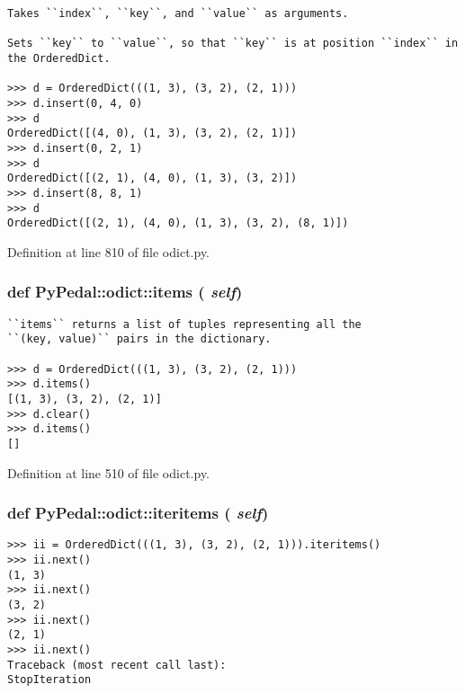 \footnotesize\begin{verbatim}
Takes ``index``, ``key``, and ``value`` as arguments.

Sets ``key`` to ``value``, so that ``key`` is at position ``index`` in
the OrderedDict.

>>> d = OrderedDict(((1, 3), (3, 2), (2, 1)))
>>> d.insert(0, 4, 0)
>>> d
OrderedDict([(4, 0), (1, 3), (3, 2), (2, 1)])
>>> d.insert(0, 2, 1)
>>> d
OrderedDict([(2, 1), (4, 0), (1, 3), (3, 2)])
>>> d.insert(8, 8, 1)
>>> d
OrderedDict([(2, 1), (4, 0), (1, 3), (3, 2), (8, 1)])
\end{verbatim}
\normalsize
 

Definition at line 810 of file odict.py.\hypertarget{namespacePyPedal_1_1odict_157cd44354275c74279e628f938c41d8}{
\subsubsection{\setlength{\rightskip}{0pt plus 5cm}def PyPedal::odict::items ( {\em self})}}
\label{namespacePyPedal_1_1odict_157cd44354275c74279e628f938c41d8}




\footnotesize\begin{verbatim}
``items`` returns a list of tuples representing all the 
``(key, value)`` pairs in the dictionary.

>>> d = OrderedDict(((1, 3), (3, 2), (2, 1)))
>>> d.items()
[(1, 3), (3, 2), (2, 1)]
>>> d.clear()
>>> d.items()
[]
\end{verbatim}
\normalsize
 

Definition at line 510 of file odict.py.\hypertarget{namespacePyPedal_1_1odict_c81fa8dc74aee51a431e46876da56c28}{
\subsubsection{\setlength{\rightskip}{0pt plus 5cm}def PyPedal::odict::iteritems ( {\em self})}}
\label{namespacePyPedal_1_1odict_c81fa8dc74aee51a431e46876da56c28}




\footnotesize\begin{verbatim}
>>> ii = OrderedDict(((1, 3), (3, 2), (2, 1))).iteritems()
>>> ii.next()
(1, 3)
>>> ii.next()
(3, 2)
>>> ii.next()
(2, 1)
>>> ii.next()
Traceback (most recent call last):
StopIteration
\end{verbatim}
\normalsize
 

